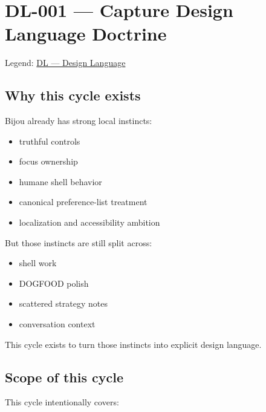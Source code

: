 \chapter{DL-001 --- Capture Design Language Doctrine}\label{record-168}

\smallskip

Legend: \href{https://github.com/flyingrobots/bijou/blob/1853ad902f6bf219326409e7f743a5a1d6517dbc/docs/legends/DL-design-language.md}{DL --- Design Language}

\section{Why this cycle exists}\label{record-168-why-this-cycle-exists}

Bijou already has strong local instincts:

\begin{itemize}
\tightlist
\item
  truthful controls
\item
  focus ownership
\item
  humane shell behavior
\item
  canonical preference-list treatment
\item
  localization and accessibility ambition
\end{itemize}

But those instincts are still split across:

\begin{itemize}
\tightlist
\item
  shell work
\item
  DOGFOOD polish
\item
  scattered strategy notes
\item
  conversation context
\end{itemize}

This cycle exists to turn those instincts into explicit design language.

\section{Scope of this cycle}\label{record-168-scope-of-this-cycle}

This cycle intentionally covers:

